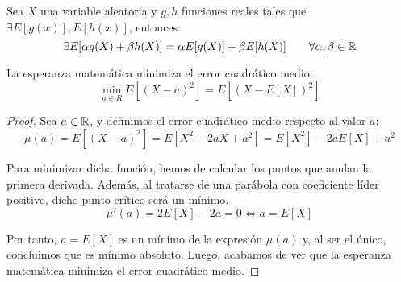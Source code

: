 \begin{coro}
    Sea $X$ una variable aleatoria y $g, h$ funciones reales tales que $\exists E[g(x)], E[h(x)]$, entonces:
    $$\exists E[\alpha g(X) + \beta h(X)] = \alpha E[g(X)] + \beta E[h(X)] \qquad \forall \alpha, \beta \in \mathbb R$$
\end{coro}

\begin{prop}
    La esperanza matemática minimiza el error cuadrático medio:
    $$\min_{a \in R} E[(X-a)^2] = E[(X-E[X])^2]$$
\end{prop}
\begin{proof}
    Sea $a \in \mathbb R$, y definimos el error cuadrático medio respecto al valor $a$:
    $$\mu(a) = E[(X-a)^2] = E[X^2-2aX+a^2] = E[X^2] - 2aE[X] + a^2$$

    Para minimizar dicha función, hemos de calcular los puntos que anulan la primera derivada. Además, al tratarse de una parábola con coeficiente líder positivo, dicho punto crítico será un mínimo.
    $$\mu'(a) = 2E[X] - 2a = 0 \Longleftrightarrow a = E[X]$$

    Por tanto, $a=E[X]$ es un mínimo de la expresión $\mu(a)$ y, al ser el único, concluimos que es mínimo absoluto.
    Luego, acabamos de ver que la esperanza matemática minimiza el error cuadrático medio.
\end{proof}

